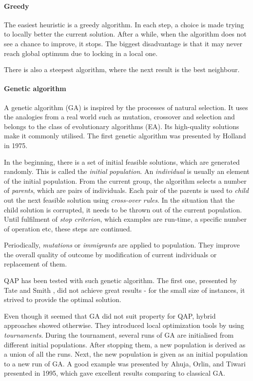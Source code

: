 \paragraph{Greedy}

The easiest heuristic is a greedy algorithm.
In each step, a choice is made trying to locally better the current solution.
After a while, when the algorithm does not see a chance to improve, it stops.
The biggest disadvantage is that it may never reach global optimum due to locking in a local one.

There is also a steepest algorithm, where the next result is the best neighbour.


\paragraph{Genetic algorithm}

A genetic algorithm (GA) is inspired by the processes of natural selection.
It uses the analogies from a real world such as mutation, crossover and selection and belongs to the class of evolutionary algorithms (EA).
Its high-quality solutions make it commonly utilised.
The first genetic algorithm was presented by Holland \cite{holland1975adaptation} in 1975.

In the beginning, there is a set of initial feasible solutions, which are generated randomly.
This is called the \textit{initial population}.
An \textit{individual} is usually an element of the initial population.
From the current group, the algorithm selects a number of \textit{parents}, which are pairs of individuals.
Each pair of the parents is used to \textit{child} out the next feasible solution using \textit{cross-over rules}.
In the situation that the child solution is corrupted, it needs to be thrown out of the current population.
Until fulfilment of \textit{stop criterion}, which examples are run-time, a specific number of operation etc, these steps are continued.

Periodically, \textit{mutations} or \textit{immigrants} are applied to population.
They improve the overall quality of outcome by modification of current individuals or replacement of them.

QAP has been tested with such genetic algorithm.
The first one, presented by Tate and Smith \cite{tate1995genetic}, did not achieve great results - for the small size of instances, it strived to provide the optimal solution.

Even though it seemed that GA did not suit property for QAP, hybrid approaches showed otherwise.
They introduced local optimization tools by using \textit{tournaments}.
During the tournament, several runs of GA are initialised from different initial populations.
After stopping them, a new population is derived as a union of all the runs.
Next, the new population is given as an initial population to a new run of GA.
A good example was presented by Ahuja, Orlin, and Tiwari \cite{ahuja2000greedy} presented in 1995, which gave excellent results comparing to classical GA.

